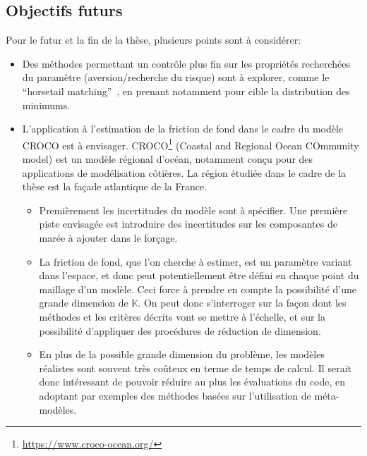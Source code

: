 \documentclass[../../Main_ManuscritThese.tex]{subfiles}
\begin{document}
\subsection{Objectifs futurs}
Pour le futur et la fin de la thèse, plusieurs points sont à considérer:
\begin{itemize}
\item Des méthodes permettant un contrôle plus fin sur les propriétés recherchées du paramètre (aversion/recherche du risque) sont à explorer, comme le ``horsetail matching''~\cite{cook_horsetail_2018}, en prenant notamment pour cible la distribution des minimums.
\item L'application à l'estimation de la friction de fond dans le cadre du modèle CROCO est à envisager. CROCO\footnote{\url{https://www.croco-ocean.org/}} (Coastal and Regional Ocean COmmunity model) est un modèle régional d'océan, notamment conçu pour des applications de modélisation côtières. La région étudiée dans le cadre de la thèse est la façade atlantique de la France. 
  \begin{itemize}
    \item Premièrement les incertitudes du modèle sont à spécifier. Une première piste envisagée est introduire des incertitudes sur les composantes de marée à ajouter dans le forçage.
  \item La friction de fond, que l'on cherche à estimer, est un paramètre variant dans l'espace, et donc peut potentiellement être défini en chaque point du maillage d'un modèle. Ceci force à prendre en compte la possibilité d'une grande dimension de $\mathbb{K}$. On peut donc s'interroger sur la façon dont les méthodes et les critères décrits vont se mettre à l'échelle, et sur la possibilité d'appliquer des procédures de réduction de dimension.
  \item En plus de la possible grande dimension du problème, les modèles réalistes sont souvent très coûteux en terme de temps de calcul. Il serait donc intéressant de pouvoir réduire au plus les évaluations du code, en adoptant par exemples des méthodes basées sur l'utilisation de méta-modèles. 
  \end{itemize}
\end{itemize}

 



\subfileLocal{
	\pagestyle{empty}
	
	
}
\end{document}
